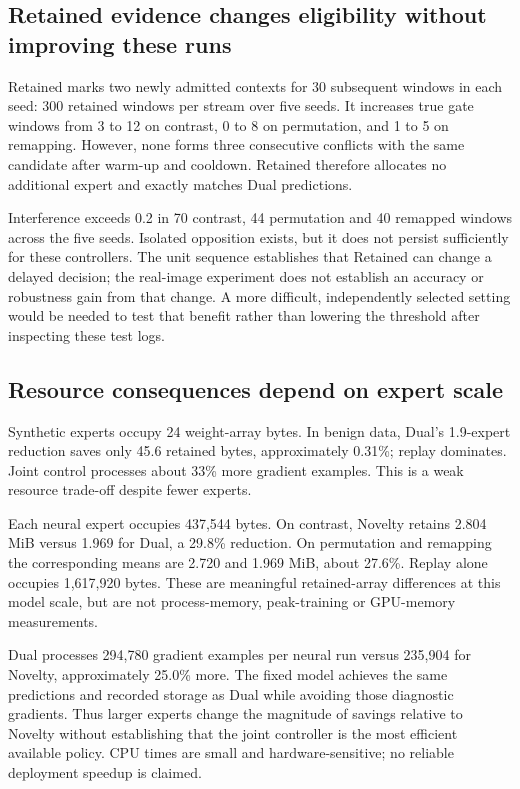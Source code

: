 \subsection{Retained evidence changes eligibility without improving these runs}
Retained marks two newly admitted contexts for 30 subsequent windows in each seed: 300 retained windows per stream over five seeds. It increases true gate windows from 3 to 12 on contrast, 0 to 8 on permutation, and 1 to 5 on remapping. However, none forms three consecutive conflicts with the same candidate after warm-up and cooldown. Retained therefore allocates no additional expert and exactly matches Dual predictions.

Interference exceeds 0.2 in 70 contrast, 44 permutation and 40 remapped windows across the five seeds. Isolated opposition exists, but it does not persist sufficiently for these controllers. The unit sequence establishes that Retained can change a delayed decision; the real-image experiment does not establish an accuracy or robustness gain from that change. A more difficult, independently selected setting would be needed to test that benefit rather than lowering the threshold after inspecting these test logs.

\subsection{Resource consequences depend on expert scale}
Synthetic experts occupy 24 weight-array bytes. In benign data, Dual's 1.9-expert reduction saves only 45.6 retained bytes, approximately 0.31\%; replay dominates. Joint control processes about 33\% more gradient examples. This is a weak resource trade-off despite fewer experts.

Each neural expert occupies 437,544 bytes. On contrast, Novelty retains 2.804 MiB versus 1.969 for Dual, a 29.8\% reduction. On permutation and remapping the corresponding means are 2.720 and 1.969 MiB, about 27.6\%. Replay alone occupies 1,617,920 bytes. These are meaningful retained-array differences at this model scale, but are not process-memory, peak-training or GPU-memory measurements.

Dual processes 294,780 gradient examples per neural run versus 235,904 for Novelty, approximately 25.0\% more. The fixed model achieves the same predictions and recorded storage as Dual while avoiding those diagnostic gradients. Thus larger experts change the magnitude of savings relative to Novelty without establishing that the joint controller is the most efficient available policy. CPU times are small and hardware-sensitive; no reliable deployment speedup is claimed.
